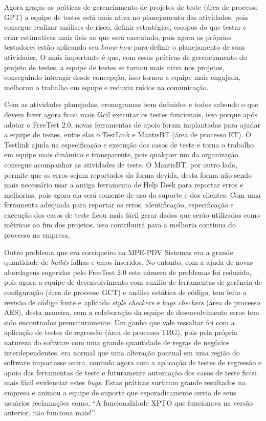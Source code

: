 Agora graças as práticas de gerenciamento de projetos de teste (área de processo GPT) a equipe de testes está mais ativa no planejamento das atividades, pois consegue realizar análises de risco, definir estratégias, escopos do que testar e criar estimativas mais fieis ao que será executado, pois agora os próprios testadores estão aplicando seu \textit{know-how} para definir o planejamento de suas atividades. O mais importante é que, com essas práticas de gerenciamento do projeto de testes, a equipe de testes se tornou mais ativa nos projetos, conseguindo interagir desde concepção, isso tornou a equipe mais engajada, melhorou o trabalho em equipe e reduziu ruídos na comunicação.

Com as atividades planejadas, cronogramas bem definidos e todos sabendo o que devem fazer agora ficou mais fácil executar os testes funcionais, isso porque após adotar o FreeTest 2.0, novas ferramentas de apoio foram implantadas para ajudar a equipe de testes, entre elas o TestLink e MantisBT (área de processo ET). O Testlink ajuda na especificação e execução dos casos de teste e torna o trabalho em equipe mais dinâmico e transparente, pois qualquer um da organização consegue acompanhar as atividades de teste. O MantisBT, por outro lado, permite que os erros sejam reportados da forma devida, desta forma não sendo mais necessário usar a antiga ferramenta de Help Desk para reportar erros e melhorias, pois agora ela será somente de uso do suporte e dos clientes. Com uma ferramenta adequada para reportar os erros, identificação, especificação e execução dos casos de teste ficou mais fácil gerar dados que serão utilizados como métricas ao fim dos projetos, isso contribuirá para a melhoria contínua do processo na empresa.

Outro problema que era corriqueiro na MPE-PDV Sistemas era a grande quantidade de \textit{builds} falhas e erros inseridos. No entanto, com a ajuda de novas abordagens sugeridas pelo FreeTest 2.0 este número de problemas foi reduzido, pois agora a equipe de desenvolvimento com auxilio de ferramentas de gerência de configuração (área de processo GCT) e análise estática de código, tem feito a revisão de código fonte e aplicado \textit{style checkers} e \textit{bugs checkers} (área de processo AES), desta maneira, com a colaboração da equipe de desenvolvimento erros tem sido encontrados prematuramente. Um ganho que vale ressaltar foi com a aplicação de testes de regressão (área de processo TRG), pois pela própria natureza do software com uma grande quantidade de regras de negócios interdependentes, era normal que uma alteração pontual em uma região do software impactasse outra, contudo agora com a aplicação de testes de regressão e apoio das ferramentas de teste e futuramente automação dos casos de teste ficou mais fácil evidenciar estes \textit{bugs}. Estas práticas surtiram grande resultados na empresa e animou a equipe de suporte que esporadicamente ouvia de seus usuários reclamações como, “A funcionalidade XPTO que funcionava na versão anterior, não funciona mais!”.

